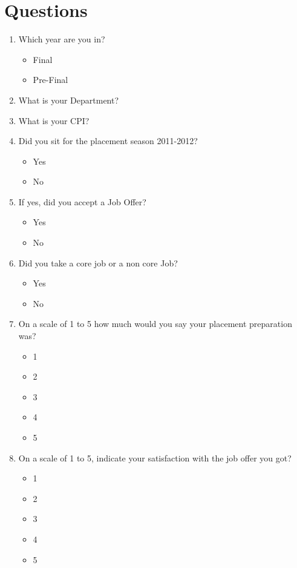 \documentclass[a4paper,12pt]{report}
\begin{document}
\section{Questions}
\begin{enumerate}
 \item Which year are you in?
  \begin{itemize}
   \item Final
   \item Pre-Final
  \end{itemize}
 \item What is your Department?
 \item What is your CPI?
 \item Did you sit for the placement season 2011-2012?
  \begin{itemize}
   \item Yes
   \item No
  \end{itemize}
 \item If yes, did you accept a Job Offer?
  \begin{itemize}
   \item Yes
   \item No
  \end{itemize}
 \item Did you take a core job or a non core Job?
  \begin{itemize}
   \item Yes
   \item No
  \end{itemize}
 \item On a scale of 1 to 5 how much would you say your placement preparation was?
  \begin{multicols}{5}
  \begin{itemize}
   \item 1
   \item 2
   \item 3
   \item 4
   \item 5
  \end{itemize}
  \end{multicols}
 \item On a scale of 1 to 5, indicate your satisfaction with the job offer you got?
  \begin{multicols}{5}
  \begin{itemize}
   \item 1
   \item 2
   \item 3
   \item 4
   \item 5
  \end{itemize}
  \end{multicols}
\end{enumerate}
\end{document}

